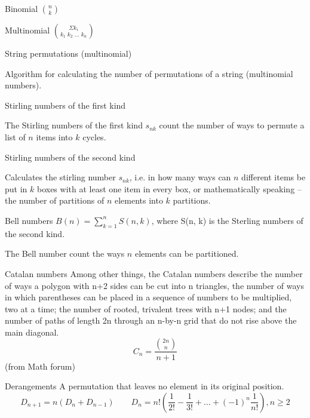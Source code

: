 

\begin{algorithm}{Binomial $\binom{n}{k}$}
\end{algorithm}

\begin{algorithm}{Multinomial $\binom{\Sigma k_i}{k_1\;k_2\;\ldots\;k_n}$}
\end{algorithm}

\begin{algorithm}{String permutations (multinomial)}

Algorithm for calculating the number of permutations of a string
(multinomial numbers).
\end{algorithm}

\begin{algorithm}{Stirling numbers of the first kind}

The Stirling numbers of the first kind $s_{nk}$ count the number of ways to permute a list of $n$ items into $k$ cycles. 
\end{algorithm}

\begin{algorithm}{Stirling numbers of the second kind}

Calculates the stirling number $s_{nk}$, i.e. in how many ways can $n$
different items be put in $k$ boxes with at least one item in every box, or
mathematically speaking -- the number of partitions of $n$ elements into
$k$ partitions.
\end{algorithm}

\begin{algorithm}{Bell numbers}
\keyword{} $B(n) = \sum_{k=1}^n S(n,k)$, where S(n, k) is the Sterling numbers of the second kind.

The Bell number count the ways $n$ elements can be partitioned.
\end{algorithm}

\begin{algorithm}{Catalan numbers}
\keyword{}
Among other things, the Catalan numbers describe the number of ways a polygon
with n+2 sides can be cut into n triangles, the number of ways in which
parentheses can be placed in a sequence of numbers to be multiplied, two at
a time; the number of rooted, trivalent trees with n+1 nodes; and the number
of paths of length 2n through an n-by-n grid that do not rise above the
main diagonal.
$$ C_n = \frac{\binom{2n}{n}}{\scriptstyle n+1} $$
(from Math forum)
\end{algorithm}

\begin{algorithm}{Derangements}
\keyword{}
A permutation that leaves no element in its original position.
$$D_{n+1}=n(D_n+D_{n-1})
\qquad
D_n=n!\left(\frac 1{2!}-\frac 1{3!}+\ldots+(-1)^n\frac 1{n!}\right), n\ge 2$$
\end{algorithm}


